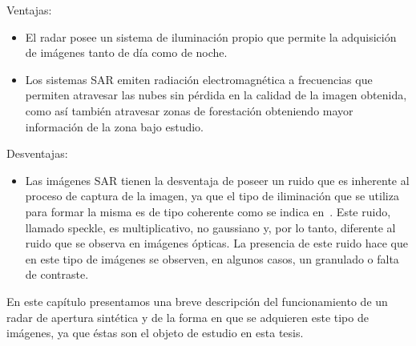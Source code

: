 Ventajas:
\begin{itemize}
	\item El radar posee un sistema de iluminación propio que permite la adquisición de imágenes tanto de día como de noche.
	\item Los sistemas SAR emiten radiación electromagnética a frecuencias que permiten atravesar las nubes sin pérdida en la calidad de la imagen obtenida, como así también atravesar zonas de forestación obteniendo mayor información de la zona bajo estudio.
\end{itemize}

Desventajas: 
\begin{itemize}
	\item Las imágenes SAR tienen la desventaja de poseer un ruido que es inherente al proceso de captura de la imagen, ya que el tipo de iliminación que se utiliza para formar la misma es de tipo coherente como se indica en~\citet{goodman85}. Este ruido, llamado speckle, es multiplicativo, no gaussiano y, por lo tanto, diferente al ruido que se observa en imágenes ópticas. La presencia de este ruido hace que en este tipo de imágenes se observen, en algunos casos, un granulado o falta de contraste.
\end{itemize}

En este capítulo presentamos una breve descripción del funcionamiento de un radar de apertura sintética y de la forma en que se adquieren este tipo de imágenes, ya que éstas son el objeto de estudio en esta tesis.



